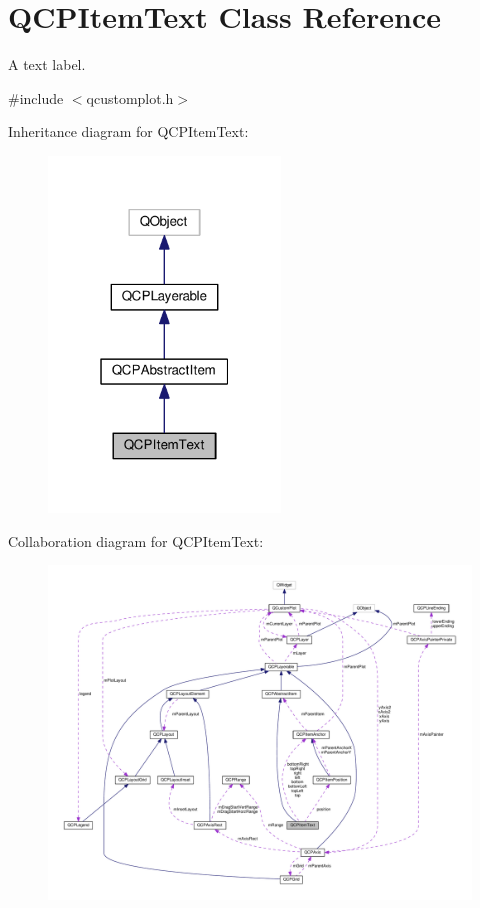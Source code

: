 \hypertarget{classQCPItemText}{}\section{Q\+C\+P\+Item\+Text Class Reference}
\label{classQCPItemText}


A text label.  




{\ttfamily \#include $<$qcustomplot.\+h$>$}



Inheritance diagram for Q\+C\+P\+Item\+Text\+:\nopagebreak
\begin{figure}[H]
\begin{center}
\leavevmode
\includegraphics[width=175pt]{classQCPItemText__inherit__graph}
\end{center}
\end{figure}


Collaboration diagram for Q\+C\+P\+Item\+Text\+:\nopagebreak
\begin{figure}[H]
\begin{center}
\leavevmode
\includegraphics[width=350pt]{classQCPItemText__coll__graph}
\end{center}
\end{figure}

